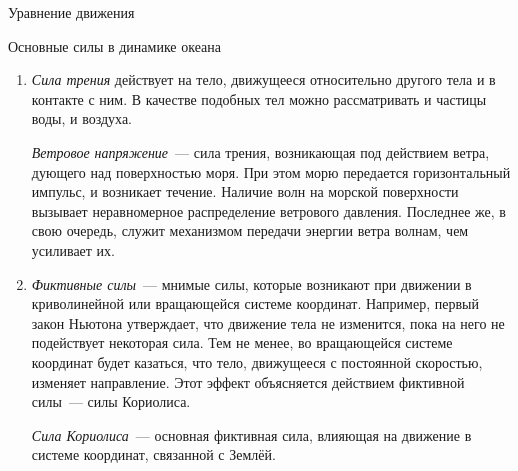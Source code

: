 \begin{chapter}{Уравнение движения}
\begin{section}{Основные силы в динамике океана}
\begin{enumerate}
\item
\emph{Сила трения} действует на тело, движущееся относительно другого тела
и в контакте с ним. В качестве подобных тел можно рассматривать и частицы
воды, и воздуха.
% 

\emph{Ветровое напряжение}~--- сила трения, возникающая под действием
ветра, дующего над поверхностью моря. При этом морю передается горизонтальный
импульс, и возникает течение. Наличие волн на морской поверхности вызывает
неравномерное распределение ветрового давления. Последнее же, в свою очередь, 
служит механизмом передачи энергии ветра волнам, чем усиливает их.
%

\item
\emph{Фиктивные силы}~--- мнимые силы, которые возникают при движении
в криволинейной или вращающейся системе координат. Например, первый закон 
Ньютона утверждает, что движение тела не изменится, пока на него не 
подействует некоторая сила. Тем не менее, во вращающейся системе координат 
будет казаться, что тело, движущееся с постоянной скоростью, изменяет 
направление. Этот эффект объясняется действием фиктивной силы~--- силы 
Кориолиса.
%

\emph{Сила Кориолиса}~--- основная фиктивная сила, влияющая на движение
в системе координат, связанной с Землёй.
%
\end{enumerate}


\end{section}
\end{chapter}
